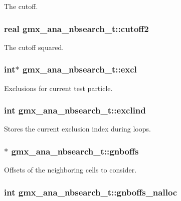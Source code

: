 \-The cutoff. \hypertarget{structgmx__ana__nbsearch__t_aae8e35e15305bdd6406af9698967d003}{
\subsubsection[{cutoff2}]{\setlength{\rightskip}{0pt plus 5cm}real {\bf gmx\-\_\-ana\-\_\-nbsearch\-\_\-t\-::cutoff2}}}\label{structgmx__ana__nbsearch__t_aae8e35e15305bdd6406af9698967d003}
\-The cutoff squared. \hypertarget{structgmx__ana__nbsearch__t_a6311e2eff1a4c1d648a4aada21c61c1c}{
\subsubsection[{excl}]{\setlength{\rightskip}{0pt plus 5cm}int$\ast$ {\bf gmx\-\_\-ana\-\_\-nbsearch\-\_\-t\-::excl}}}\label{structgmx__ana__nbsearch__t_a6311e2eff1a4c1d648a4aada21c61c1c}
\-Exclusions for current test particle. \hypertarget{structgmx__ana__nbsearch__t_abfb2768d6aa3cf44104b16aa988cee24}{
\subsubsection[{exclind}]{\setlength{\rightskip}{0pt plus 5cm}int {\bf gmx\-\_\-ana\-\_\-nbsearch\-\_\-t\-::exclind}}}\label{structgmx__ana__nbsearch__t_abfb2768d6aa3cf44104b16aa988cee24}
\-Stores the current exclusion index during loops. \hypertarget{structgmx__ana__nbsearch__t_acdab9ce3682b778d1cfa808ae3cd0591}{
\subsubsection[{gnboffs}]{$\ast$ {\bf gmx\-\_\-ana\-\_\-nbsearch\-\_\-t\-::gnboffs}}}\label{structgmx__ana__nbsearch__t_acdab9ce3682b778d1cfa808ae3cd0591}
\-Offsets of the neighboring cells to consider. \hypertarget{structgmx__ana__nbsearch__t_ace2ad9f1064295af8bf114c724c83779}{
\subsubsection[{gnboffs\-\_\-nalloc}]{\setlength{\rightskip}{0pt plus 5cm}int {\bf gmx\-\_\-ana\-\_\-nbsearch\-\_\-t\-::gnboffs\-\_\-nalloc}}}\label{structgmx__ana__nbsearch__t_ace2ad9f1064295af8bf114c724c83779}
